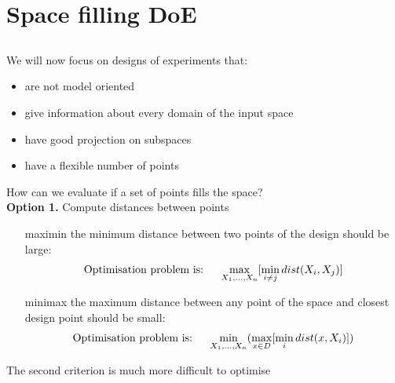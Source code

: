 \section{Space filling DoE}
\subsection{}


\begin{frame}{}
We will now focus on designs of experiments that:
\begin{itemize}
	\item are not model oriented
	\item give information about every domain of the input space
	\item have good projection on subspaces
	\item have a flexible number of points
\end{itemize}
\end{frame}

\begin{frame}{}
How can we evaluate if a set of points fills the space?\\ \vspace{5mm}
\textbf{Option 1.} Compute distances between points\\
\begin{itemize}
	\item[maximin] the minimum distance between two points of the design should be large:
	$$\text{Optimisation problem is: \quad} \max_{X_1,\dots,X_n} [ \min_{i \neq j} dist(X_i,X_j) ]$$
	\item[minimax] the maximum distance between any point of the space and closest design point should be small:
	$$\text{Optimisation problem is: \quad} \min_{X_1,\dots,X_n} (\max_{x \in D} [ \min_i dist(x,X_i) ])$$
\end{itemize}
The second criterion is much more difficult to optimise
\end{frame}

